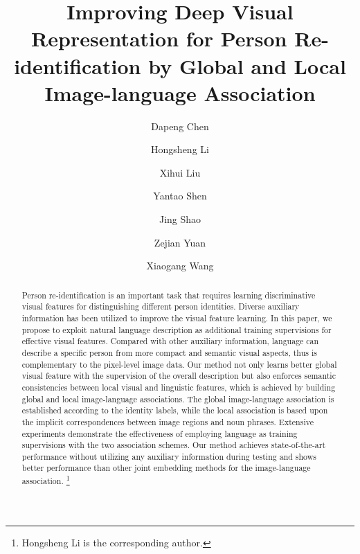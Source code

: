 \documentclass[runningheads]{llncs}
\newcommand\blfootnote[1]{\begingroup
  \renewcommand\thefootnote{}\footnote{#1}\addtocounter{footnote}{-1}\endgroup
}
\begin{document}
\title{Improving Deep Visual Representation for Person Re-identification by Global and Local Image-language Association} 


\author{Dapeng Chen \and
Hongsheng Li  \and Xihui Liu  \and Yantao Shen \and Jing Shao  
\and Zejian Yuan \and Xiaogang Wang}


\maketitle              \begin{abstract}
Person re-identification is an important task that requires learning discriminative visual features for distinguishing different person identities. Diverse auxiliary information has been utilized to improve the visual feature learning. In this paper, we propose to exploit natural language description as additional training supervisions for effective visual features. Compared with other auxiliary information, language can describe a specific person from more compact and semantic visual aspects, thus is complementary to the pixel-level image data. Our method not only learns better global visual feature with the supervision of the overall description but also enforces semantic consistencies between local visual and linguistic features, which is achieved by building global and local image-language associations. The global image-language association is established
according to the identity labels, while the local association is based upon the implicit correspondences between image regions and noun phrases. Extensive experiments demonstrate the effectiveness of employing language as training supervisions with the two association schemes. Our method achieves state-of-the-art performance without utilizing any auxiliary information during testing and shows better performance than other joint embedding methods for the image-language association. \blfootnote{ Hongsheng Li is the corresponding author.}
\end{abstract}
\end{document}
